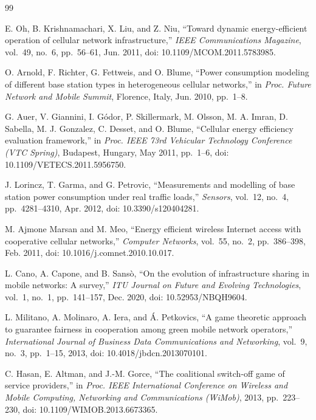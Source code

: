 \documentclass{article}
\theoremstyle{definition}
\theoremstyle{remark}
\theoremstyle{remark}
\theoremstyle{plain}
\theoremstyle{definition}
\theoremstyle{definition}
\theoremstyle{definition}
\begin{document}
\begin{thebibliography}{99}

E. Oh, B. Krishnamachari, X. Liu, and Z. Niu,
``Toward dynamic energy-efficient operation of cellular network
infrastructure,'' \textit{IEEE Communications Magazine}, vol.~49, no.~6,
pp.~56--61, Jun. 2011, doi: 10.1109/MCOM.2011.5783985.

O. Arnold, F. Richter, G. Fettweis, and O. Blume,
``Power consumption modeling of different base station types in heterogeneous
cellular networks,'' in \textit{Proc. Future Network and Mobile Summit},
Florence, Italy, Jun. 2010, pp.~1--8.

G. Auer, V. Giannini, I. G\'odor, P. Skillermark, M. Olsson, M. A. Imran,
D. Sabella, M. J. Gonzalez, C. Desset, and O. Blume,
``Cellular energy efficiency evaluation framework,'' in \textit{Proc. IEEE
73rd Vehicular Technology Conference (VTC Spring)}, Budapest, Hungary,
May 2011, pp.~1--6, doi: 10.1109/VETECS.2011.5956750.

J. Lorincz, T. Garma, and G. Petrovic,
``Measurements and modelling of base station power consumption under real
traffic loads,'' \textit{Sensors}, vol.~12, no.~4, pp.~4281--4310,
Apr. 2012, doi: 10.3390/s120404281.

M. Ajmone Marsan and M. Meo,
``Energy efficient wireless Internet access with cooperative cellular
networks,'' \textit{Computer Networks}, vol.~55, no.~2, pp.~386--398,
Feb. 2011, doi: 10.1016/j.comnet.2010.10.017.

L. Cano, A. Capone, and B. Sans\`o,
``On the evolution of infrastructure sharing in mobile networks: A survey,''
\textit{ITU Journal on Future and Evolving Technologies}, vol.~1, no.~1,
pp.~141--157, Dec. 2020, doi: 10.52953/NBQH9604.

L. Militano, A. Molinaro, A. Iera, and \'{A}. Petkovics,
``A game theoretic approach to guarantee fairness in cooperation among green
mobile network operators,'' \textit{International Journal of Business Data
Communications and Networking}, vol.~9, no.~3, pp.~1--15, 2013,
doi: 10.4018/jbdcn.2013070101.

C. Hasan, E. Altman, and J.-M. Gorce,
``The coalitional switch-off game of service providers,'' in
\textit{Proc. IEEE International Conference on Wireless and Mobile Computing,
Networking and Communications (WiMob)}, 2013, pp.~223--230,
doi: 10.1109/WIMOB.2013.6673365.


\end{thebibliography}
\end{document}
